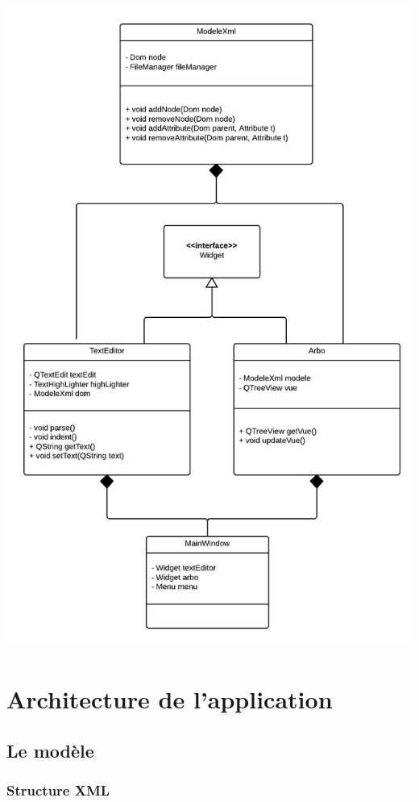 \includegraphics[scale=0.4]{images/classes.png}

\section{Architecture de l'application}
\subsection{Le modèle}

\subsubsection{Structure XML}

